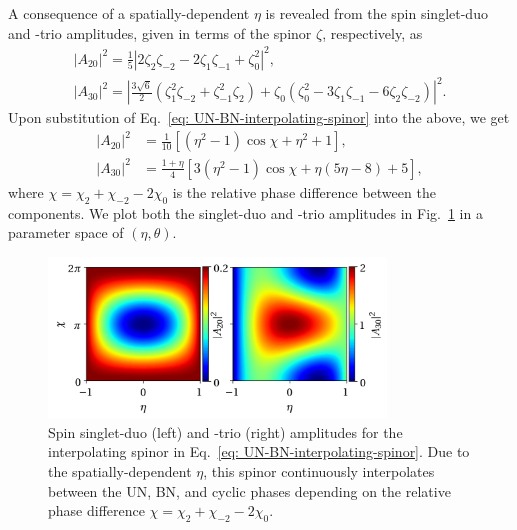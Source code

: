 A consequence of a spatially-dependent \(\eta \) is revealed from the spin
singlet-duo and -trio amplitudes, given in terms of the spinor \(\zeta\),
respectively, as
\begin{gather}\label{eq: a20definition}
    |A_{20}|^2 = \frac{1}{5}\left|2\zeta_2\zeta_{-2}-2\zeta_1\zeta_{-1}
    + \zeta_0^2\right|^2, \\
    |A_{30}|^2 = \left|\frac{3\sqrt{6}}{2}\left(\zeta_1^2\zeta_{-2}
    + \zeta_{-1}^2\zeta_2\right)
    + \zeta_0\left(\zeta_0^2-3\zeta_1\zeta_{-1}
    - 6\zeta_2\zeta_{-2}\right)\right|^2.
\end{gather}
Upon substitution of Eq.~\eqref{eq: UN-BN-interpolating-spinor} into the above,
we get
\begin{equation}
    \begin{aligned}
        |A_{20}|^2 & = \frac{1}{10} \left[(\eta^2-1)\cos\chi
        + \eta^2 + 1\right],                                          \\
        |A_{30}|^2 & = \frac{1+\eta}{4} \left[3\left(\eta ^2-1\right)
            \cos\chi
            + \eta(5 \eta -8) + 5\right],
    \end{aligned}
\end{equation}
where \(\chi = \chi_2 + \chi_{-2} - 2\chi_0\) is the relative phase difference
between the components.
We plot both the singlet-duo and -trio amplitudes in
Fig.~\ref{fig: UN-BN-duo-trio} in a parameter space of \((\eta, \theta)\).
\begin{figure}
    \centering
    \includegraphics[width=0.8\textwidth]{gfx/ch-spin2/a20-a30-varying.png}
    \caption[Spin-singlet duo and trio amplitudes in a parameter space of
        \(\chi \) and \(\eta \)]
    {\label{fig: UN-BN-duo-trio} Spin singlet-duo (left) and -trio
        (right) amplitudes for the interpolating spinor in
        Eq.~\eqref{eq: UN-BN-interpolating-spinor}.
        Due to the spatially-dependent \(\eta \), this spinor continuously
        interpolates between the UN, BN, and cyclic phases depending on the
        relative phase difference \(\chi=\chi_2+\chi_{-2}-2\chi_0\).}
\end{figure}
